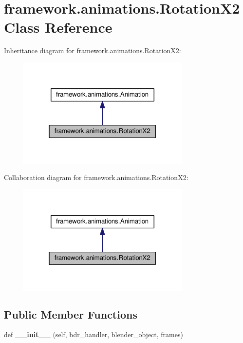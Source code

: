 \hypertarget{classframework_1_1animations_1_1RotationX2}{}\section{framework.\+animations.\+Rotation\+X2 Class Reference}
\label{classframework_1_1animations_1_1RotationX2}


Inheritance diagram for framework.\+animations.\+Rotation\+X2\+:
\nopagebreak
\begin{figure}[H]
\begin{center}
\leavevmode
\includegraphics[width=244pt]{classframework_1_1animations_1_1RotationX2__inherit__graph}
\end{center}
\end{figure}


Collaboration diagram for framework.\+animations.\+Rotation\+X2\+:
\nopagebreak
\begin{figure}[H]
\begin{center}
\leavevmode
\includegraphics[width=244pt]{classframework_1_1animations_1_1RotationX2__coll__graph}
\end{center}
\end{figure}
\subsection*{Public Member Functions}
\begin{DoxyCompactItemize}
\item 
def {\bfseries \+\_\+\+\_\+init\+\_\+\+\_\+} (self, bdr\+\_\+handler, blender\+\_\+object, frames)\hypertarget{classframework_1_1animations_1_1RotationX2_a4c9bbc3d03d5976a48d9ce9ab6539600}{}\label{classframework_1_1animations_1_1RotationX2_a4c9bbc3d03d5976a48d9ce9ab6539600}

\end{DoxyCompactItemize}
